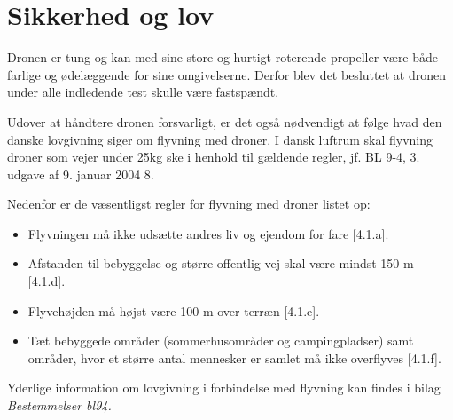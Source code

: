 \section{Sikkerhed og lov}

Dronen er tung og kan med sine store og hurtigt roterende propeller være både farlige og ødelæggende for sine omgivelserne. Derfor blev det besluttet at dronen under alle indledende test skulle være fastspændt. 

Udover at håndtere dronen forsvarligt, er det også nødvendigt at følge hvad den danske lovgivning siger om flyvning med droner. I dansk luftrum skal flyvning droner som vejer under 25kg ske i henhold til gældende regler, jf. BL 9-4, 3. udgave af 9. januar 2004 8. 

Nedenfor er de væsentligst regler for flyvning med droner listet op:

\begin{itemize}
	\item Flyvningen må ikke udsætte andres liv og ejendom for fare [4.1.a].
	\item Afstanden til bebyggelse og større offentlig vej skal være mindst 150 m [4.1.d].
	\item Flyvehøjden må højst være 100 m over terræn [4.1.e].
	\item Tæt bebyggede områder (sommerhusområder og campingpladser) samt områder, hvor et større antal mennesker er samlet må ikke overflyves [4.1.f].
\end{itemize}

Yderlige information om lovgivning i forbindelse med flyvning kan findes i bilag \textit{Bestemmelser bl94.}

